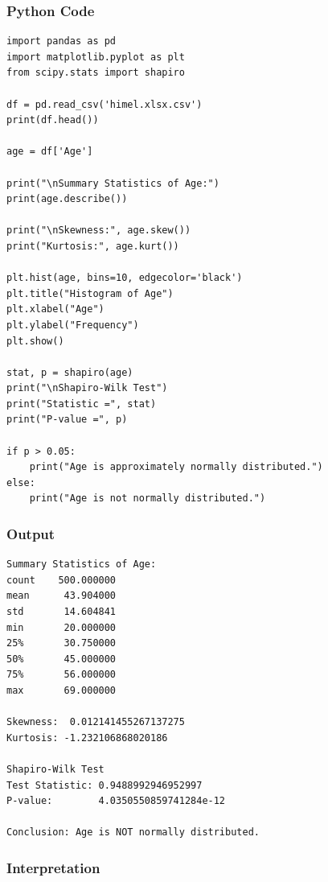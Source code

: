 \documentclass[12pt,a4paper]{article}
\begin{document}
\subsubsection{Python Code}

\begin{lstlisting}[style=pythonstyle, caption={Loading data and analysing Age distribution}]
import pandas as pd
import matplotlib.pyplot as plt
from scipy.stats import shapiro

df = pd.read_csv('himel.xlsx.csv')
print(df.head())

age = df['Age']

print("\nSummary Statistics of Age:")
print(age.describe())

print("\nSkewness:", age.skew())
print("Kurtosis:", age.kurt())

plt.hist(age, bins=10, edgecolor='black')
plt.title("Histogram of Age")
plt.xlabel("Age")
plt.ylabel("Frequency")
plt.show()

stat, p = shapiro(age)
print("\nShapiro-Wilk Test")
print("Statistic =", stat)
print("P-value =", p)

if p > 0.05:
    print("Age is approximately normally distributed.")
else:
    print("Age is not normally distributed.")
\end{lstlisting}

\subsubsection{Output}

\begin{lstlisting}[style=outputstyle, caption={Summary statistics and normality test output}]
Summary Statistics of Age:
count    500.000000
mean      43.904000
std       14.604841
min       20.000000
25%       30.750000
50%       45.000000
75%       56.000000
max       69.000000

Skewness:  0.012141455267137275
Kurtosis: -1.232106868020186

Shapiro-Wilk Test
Test Statistic: 0.9488992946952997
P-value:        4.0350550859741284e-12

Conclusion: Age is NOT normally distributed.
\end{lstlisting}

\subsubsection{Interpretation}
\end{document}
